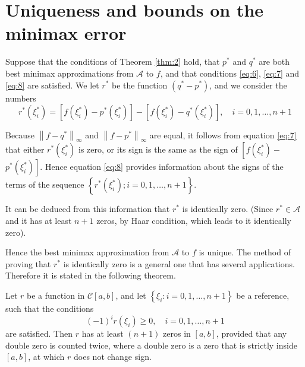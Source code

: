 \documentclass[11pt]{article}
\begin{document}
\section{Uniqueness and bounds on the minimax error}
Suppose that the conditions of Theorem \ref{thm:2} hold, that $p^{*}$ and $q^{*}$ are both best minimax approximations from $\mathscr{A}$ to $f$, and that conditions \eqref{eq:6}, \eqref{eq:7} and \eqref{eq:8} are satisfied. We let $r^{*}$ be the function $\left(q^{*}-p^{*}\right)$, and we consider the numbers
\begin{equation}
r^{*}\left(\xi_{i}^{*}\right)=\left[f\left(\xi_{i}^{*}\right)-p^{*}\left(\xi_{i}^{*}\right)\right]-\left[f\left(\xi_{i}^{*}\right)-q^{*}\left(\xi_{i}^{*}\right)\right],\quad 
i  =0,1, \ldots, n+1 \label{eq:18}
\end{equation}


Because $\left\|f-q^{*}\right\|_{\infty}$ and $\left\|f-p^{*}\right\|_{\infty}$ are equal, it follows from equation \eqref{eq:7}
that either $r^{*}\left(\xi_{i}^{*}\right)$ is zero, or its sign is the same as the sign of $\left[f\left(\xi_{i}^{*}\right)-\right.$ $\left.p^{*}\left(\xi_{i}^{*}\right)\right]$. Hence equation \eqref{eq:8} provides information about the signs of the terms of the sequence $\left\{r^{*}\left(\xi_{i}^{*}\right) ; i=0,1, \ldots, n+1\right\}$. 

It can be deduced from this information that $r^{*}$ is identically zero. (Since $r^*\in\mathscr{A}$ and it has at least $n+1$ zeros, by Haar condition, which leads to it identically zero).

 Hence the best minimax approximation from $\mathscr{A}$ to $f$ is unique. The method of proving that $r^{*}$ is identically zero is a general one that has several applications. Therefore it is stated in the following theorem.

\begin{theorem} \label{thm:5}
Let $r$ be a function in $\mathscr{C}[a, b]$, and let $\left\{\xi_{i} : i=0,1, \ldots, n+1\right\}$ be a reference, such that the conditions
\begin{equation}
(-1)^{i} r\left(\xi_{i}\right) \geqslant 0, \quad i=0,1, \ldots, n+1 \label{eq:13}
\end{equation}
are satisfied. Then $r$ has at least $(n+1)$ zeros in $[a, b]$, provided that any double zero is counted twice, where a double zero is a zero that is strictly inside $[a, b]$, at which $r$ does not change sign.
\end{theorem}
\end{document}
